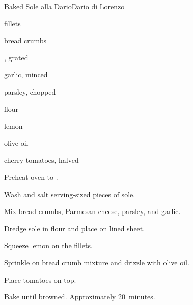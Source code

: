 \begin{recipe}{Baked Sole alla Dario}{Dario di Lorenzo}{}

\begin{ingredients}
\item {} fillets
\item bread crumbs
\item {}, grated
\item garlic, minced
\item parsley, chopped
\item flour
\item lemon
\item olive oil
\item cherry tomatoes, halved
\end{ingredients}

\begin{directions}
\item Preheat oven to .
\item Wash and salt serving-sized pieces of sole.
\item Mix bread crumbs, Parmesan cheese, parsley, and garlic.
\item Dredge sole in flour and place on lined sheet.
\item Squeeze lemon on the fillets.
\item Sprinkle on bread crumb mixture and drizzle with olive oil.
\item Place tomatoes on top.
\item Bake until browned. Approximately 20~minutes.
\end{directions}

\end{recipe}

